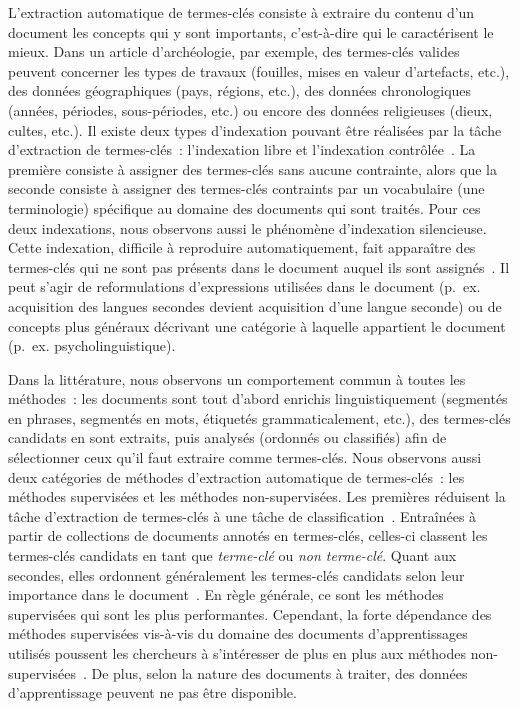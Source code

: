     L'extraction automatique de termes-clés consiste à extraire du contenu
    d'un document les concepts qui y sont importants, c'est-à-dire qui le
    caractérisent le mieux. Dans un article d'archéologie, par exemple, des
    termes-clés valides peuvent concerner les types de travaux (fouilles,
    mises en valeur d'artefacts, etc.), des données géographiques (pays,
    régions, etc.), des données chronologiques (années, périodes,
    sous-périodes, etc.) ou encore des données religieuses (dieux, cultes,
    etc.). Il existe deux types d'indexation pouvant être réalisées par la
    tâche d'extraction de termes-clés~: l'indexation libre et l'indexation
    contrôlée~\cite{paroubek2012deft}. La première consiste à assigner des
    termes-clés sans aucune contrainte, alors que la seconde consiste à
    assigner des termes-clés contraints par un vocabulaire (une terminologie)
    spécifique au domaine des documents qui sont traités. Pour ces deux
    indexations, nous observons aussi le phénomène d'indexation silencieuse.
    Cette indexation, difficile à reproduire automatiquement, fait apparaître
    des termes-clés qui ne sont pas présents dans le document auquel ils sont
    assignés~\cite{liu2011vocabularygap}. Il peut s'agir de reformulations
    d'expressions utilisées dans le document (p.~ex. \og{}acquisition des
    langues secondes\fg{} devient \og{}acquisition d'une langue seconde\fg{})
    ou de concepts plus généraux décrivant une catégorie à laquelle appartient
    le document (p.~ex. \og{}psycholinguistique\fg{}).

    Dans la littérature, nous observons un comportement commun à toutes les
    méthodes~: les documents sont tout d'abord enrichis linguistiquement
    (segmentés en phrases, segmentés en mots, étiquetés grammaticalement,
    etc.), des termes-clés candidats en sont extraits, puis analysés (ordonnés
    ou classifiés) afin de sélectionner ceux qu'il faut extraire comme
    termes-clés. Nous observons aussi deux catégories de méthodes d'extraction
    automatique de termes-clés~: les méthodes supervisées et les méthodes
    non-supervisées. Les premières réduisent la tâche d'extraction de
    termes-clés à une tâche de classification~\cite{witten1999kea}.
    Entraînées à partir de collections de documents annotés en termes-clés,
    celles-ci classent les termes-clés candidats en tant que
    \textit{terme-clé} ou \textit{non terme-clé}. Quant aux secondes, elles
    ordonnent généralement les termes-clés candidats selon leur importance
    dans le document~\cite{wan2008expandrank}. En règle générale, ce sont les
    méthodes supervisées qui sont les plus performantes. Cependant, la forte
    dépendance des méthodes supervisées vis-à-vis du domaine des documents
    d'apprentissages utilisés poussent les chercheurs à s'intéresser de plus
    en plus aux méthodes non-supervisées~\cite{hassan2010conundrums}. De
    plus, selon la nature des documents à traiter, des données d'apprentissage
    peuvent ne pas être disponible.

